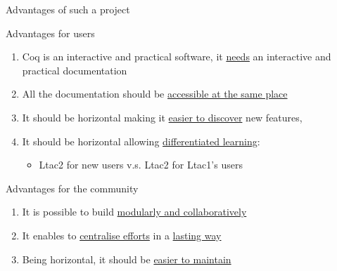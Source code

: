 \documentclass[10pt]{beamer}
\begin{document}
\begin{frame}{Advantages of such a project}
  \begin{tcbSol}{Advantages for users}
    \begin{enumerate}
      \item<1-> Coq is an interactive and practical software, it \ul{needs} an
            interactive and practical documentation
      \item<2-> All the documentation should be \ul{accessible at the same place}
      \item<3-> It should be horizontal making it \ul{easier to discover} new features,
      \item<4-> It should be horizontal allowing \ul{differentiated learning}:
      \begin{itemize}[label=$\hookrightarrow$]
        \item Ltac2 for new users\;  v.s.  \;Ltac2 for Ltac1's users
      \end{itemize}
    \end{enumerate}
  \end{tcbSol}
  \begin{tcbSol}{Advantages for the community}
    \begin{enumerate}
      \item<5-> It is possible to build \ul{modularly and collaboratively}
      \item<6-> It enables to \ul{centralise efforts} in a \ul{lasting way}
      \item<7-> Being horizontal, it should be \ul{easier to maintain}
    \end{enumerate}
  \end{tcbSol}
\end{frame}
\end{document}
